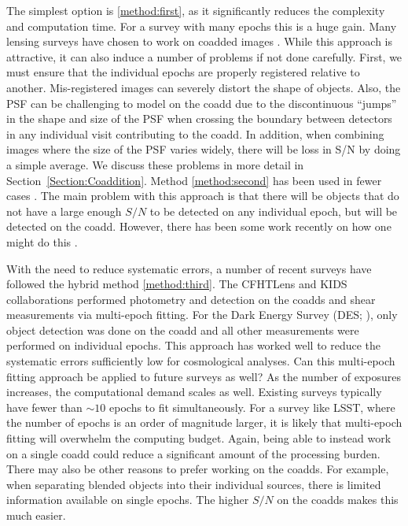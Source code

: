 \documentclass[fleqn,useAMS,usenatbib]{mnras}
\begin{document}
The simplest option is \ref{method:first}, as it significantly reduces the 
complexity and computation time.  For a survey with many epochs this is a huge 
gain.  Many lensing surveys have chosen to work on coadded images 
\citep{Hoekstra2006, Leauthaud2007, Hettersheidt2007, Lin2012,Melchior2015, 
Jee2016, Mandelbaum2018}.  While this approach is attractive, it can also induce 
a number of problems if not done carefully.  First, we must ensure that the 
individual epochs are properly registered relative to another.  Mis-registered 
images can severely distort the shape of objects. Also, the PSF can be 
challenging to model on the coadd due to the discontinuous ``jumps'' in the 
shape and size of the PSF when crossing the boundary between detectors in any individual visit
contributing to the coadd.  In addition, when combining images where the size 
of the PSF varies widely, there will be loss in S/N by doing a simple average.  
We discuss these problems in more detail in Section~\ref{Section:Coaddition}.
Method \ref{method:second} has been used in fewer cases \citep{Jarvis2003}.  
The main problem with this approach is that there will be objects that do not 
have a large enough $S/N$ to be detected on any individual epoch, but will be 
detected on the coadd.  However, there has been some work recently on how one 
might do this \citep{Budavari2017}.

With the need to reduce systematic errors, a number of recent surveys have 
followed the hybrid method \ref{method:third}.  The CFHTLens 
\citep{Heymans2013} and KIDS \citep{Hildebrandt2017} collaborations performed 
photometry and detection on the coadds and shear measurements via multi-epoch 
fitting. For the Dark Energy Survey (DES; \citealt{Zuntz2017}), only object 
detection was done on the coadd and all other measurements were performed on 
individual epochs.  This approach has worked well to reduce the systematic 
errors sufficiently low for cosmological analyses.  Can this multi-epoch 
fitting approach be applied to future surveys as well?
As the number of exposures increases, the computational demand scales as well.  
Existing surveys typically have fewer than $\sim10$ epochs to fit 
simultaneously. For a survey like LSST, where the number of epochs is an order 
of magnitude larger, it is likely that multi-epoch fitting will overwhelm the 
computing budget.  Again, being able to instead work on a single coadd could 
reduce a significant amount of the processing burden.  There may also be other 
reasons to prefer working on the coadds.  For example, when separating blended objects into 
their individual sources, there is limited information available on single 
epochs.  The higher $S/N$ on the coadds makes this much easier.  
\end{document}
